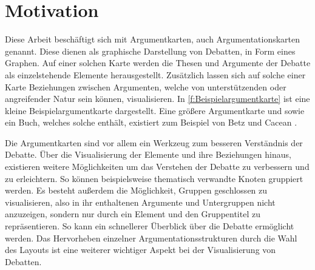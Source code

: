 \chapter{Motivation}
Diese Arbeit beschäftigt sich mit Argumentkarten, auch Argumentationskarten genannt.
Diese dienen als graphische Darstellung von Debatten, in Form eines Graphen.
Auf einer solchen Karte werden die Thesen und Argumente der Debatte als einzelstehende Elemente herausgestellt. 
Zusätzlich lassen sich auf solche einer Karte Beziehungen zwischen Argumenten, welche von unterstützenden oder angreifender Natur sein können, visualisieren.
In \autoref{f:Beispielargumentkarte} ist eine kleine Beispielargumentkarte dargestellt. 
Eine größere Argumentkarte und sowie ein Buch, welches solche enthält, existiert zum Beispiel von Betz und Cacean \cite{ClimateEngineering, betz2012ethical}.



Die Argumentkarten sind vor allem ein Werkzeug zum besseren Verständnis der Debatte. 
Über die Visualisierung der Elemente und ihre Beziehungen hinaus, existieren weitere Möglichkeiten um das Verstehen der Debatte zu verbessern und zu erleichtern.
So können beispielsweise thematisch verwandte Knoten gruppiert werden. 
Es besteht außerdem die Möglichkeit, Gruppen geschlossen zu visualisieren, also in ihr enthaltenen Argumente und Untergruppen nicht anzuzeigen, sondern nur durch ein
Element und den Gruppentitel zu repräsentieren. So kann ein schnellerer  Überblick über die Debatte ermöglicht werden.
Das Hervorheben einzelner Argumentationsstrukturen durch die Wahl des Layouts ist eine weiterer wichtiger Aspekt bei der Visualisierung von Debatten.

